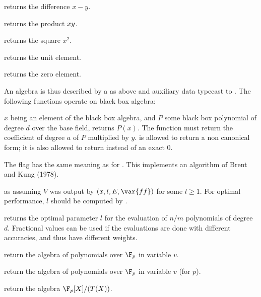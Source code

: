  returns the difference $x-y$.

 returns the product $x\*y$.

 returns the square $x^2$.

 returns the unit element.

 returns the zero element.

\noindent An algebra is thus described by a  as above
and auxiliary data typecast to . The following functions operate
on black box algebra:

$x$ being an element of the black box algebra, and $P$ some black box
polynomial of degree $d$ over the base field,  returns $P(x)$. The function
 must return the coefficient of degree $a$ of $P$
multiplied by $y$.  is allowed to return a non canonical form;
it is also allowed to return  instead of an exact $0$.

The flag  has the same meaning as for . This
implements an algorithm of Brent and Kung (1978).

as  assuming $V$ was output by
$(x, l, E, \var{ff})$ for some $l\geq 1$. For optimal
performance, $l$ should be computed by .

 returns the optimal
parameter $l$ for the evaluation of $n/m$ polynomials of degree $d$.
Fractional values can be used if the evaluations are done with different
accuracies, and thus have different weights.


return the algebra of polynomials over $\F_p$ in variable $v$.

return the algebra of polynomials over $\F_p$ in variable $v$ (for  $p$).

return the algebra $\F_p[X]/(T(X))$.

